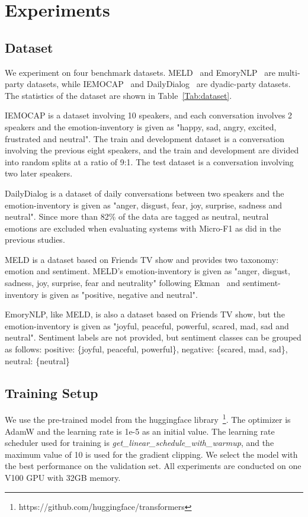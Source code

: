 \documentclass[11pt]{article}
\begin{document}
\section{Experiments}
\subsection{Dataset}
We experiment on four benchmark datasets. MELD~\cite{poria-etal-2019-meld} and EmoryNLP~\cite{emorynlp} are multi-party datasets, while IEMOCAP~\cite{iemocap} and DailyDialog~\cite{dailydialog} are dyadic-party datasets. The statistics of the dataset are shown in Table~\ref{Tab:dataset}.


IEMOCAP is a dataset involving 10 speakers, and each conversation involves 2 speakers and the emotion-inventory is given as "happy, sad, angry, excited, frustrated and neutral". The train and development dataset is a conversation involving the previous eight speakers, and the train and development are divided into random splits at a ratio of 9:1. The test dataset is a conversation involving two later speakers.


DailyDialog is a dataset of daily conversations between two speakers and the emotion-inventory is given as "anger, disgust, fear, joy, surprise, sadness and neutral". Since more than 82\% of the data are tagged as neutral, neutral emotions are excluded when evaluating systems with Micro-F1 as did in the previous studies.


MELD is a dataset based on Friends TV show and provides two taxonomy: emotion and sentiment. MELD's emotion-inventory is given as "anger, disgust, sadness, joy, surprise, fear and neutrality" following Ekman~\cite{Ekman1992AnAF} and sentiment-inventory is given as "positive, negative and neutral".


EmoryNLP, like MELD, is also a dataset based on Friends TV show, but the emotion-inventory is given as "joyful, peaceful, powerful, scared, mad, sad and neutral". Sentiment labels are not provided, but sentiment classes can be grouped as follows: positive: \{joyful, peaceful, powerful\}, negative: \{scared, mad, sad\}, neutral: \{neutral\}


\subsection{Training Setup}
We use the pre-trained model from the huggingface library~\footnote{https://github.com/huggingface/transformers}. The optimizer is AdamW and the learning rate is 1e-5 as an initial value. The learning rate scheduler used for training is \textit{get\_linear\_schedule\_with\_warmup}, and the maximum value of 10 is used for the gradient clipping. We select the model with the best performance on the validation set. All experiments are conducted on one V100 GPU with 32GB memory.
\end{document}
